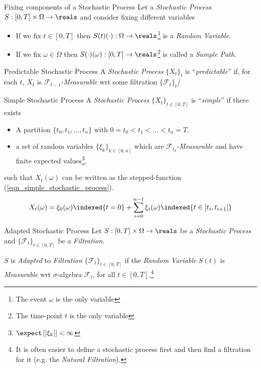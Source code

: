 \documentclass[11pt,a4paper]{article}
\begin{document}
  \begin{proposition}{Fixing components of a Stochastic Process}
    Let a \textit{Stochastic Process} $S:[0,T]\times\Omega\to\reals$ and consider fixing different variables
    \begin{itemize}
      \item If we fix $t\in[0,T]$ then $S(t)(\cdot):\Omega\to\reals$\footnote{The event $\omega$ is the only variable} is a \textit{Random Variable}.
      \item If we fix $\omega\in\Omega$ then $S(\cdot)(\omega):[0,T]\to\reals$\footnote{The time-point $t$ is the only variable} is called a \textit{Sample Path}.
    \end{itemize}
  \end{proposition}

  \begin{definition}{Predictable Stochastic Process}
    A \textit{Stochastic Process} $\{X_t\}_t$ is ``\textit{predictable}'' if, for each $t$, $X_t$ is $\mathcal{F}_{t-1}$-\textit{Measurable} wrt some filtration $\{\mathcal{F}_t\}_t$/
  \end{definition}

  \begin{definition}{Simple Stochastic Process}\label{def_simple_stochastic_process}
    A \textit{Stochastic Process} $\{X_t\}_{t\in[0,T]}$ is ``\textit{simple}'' if there exists
    \begin{itemize}
      \item A partition $\{t_0,t_1,\dots,t_n\}$ with $0=t_0<t_1<\dots<t_n=T$. %
      \item a set of random variables $\{\xi_k\}_{k\in[0,n]}$ which are $\mathcal{F}_{t_k}$-\textit{Measurable} and have finite expected values\footnote{$\expect\left[|\xi_k|\right]<\infty$}.
    \end{itemize}
    such that $X_t(\omega)$ can be written as the stepped-function (\ref{eqn_simple_stochastic_process}).
    \begin{equation}\label{eqn_simple_stochastic_process}
      X_t(\omega)=\xi_0(\omega)\indexed\{t=0\}+\sum_{i=0}^{n-1}\xi_i(\omega)\indexed\{t\in[t_i,t_{i+1}]\}
    \end{equation}
  \end{definition}

  \begin{definition}{Adapted Stochastic Process}
    Let $S:[0,T]\times\Omega\to\reals$ be a \textit{Stochastic Process} and $\{\mathcal{F}_t\}_{t\in[0,T]}$ be a \textit{Filtration}.
    \par $S$ is \textit{Adapted} to \textit{Filtration} $\{\mathcal{F}_t\}_{t\in[0,T]}$ if the \textit{Random Variable} $S(t)$ is \textit{Measurable} wrt $\sigma$-algebra $\mathcal{F}_t$, for all $t\in[0,T]$.\footnote{It is often easier to define a stochastic process first and then find a filtration for it (e.g. the \textit{Natural Filtration}).}
  \end{definition}
\end{document}
